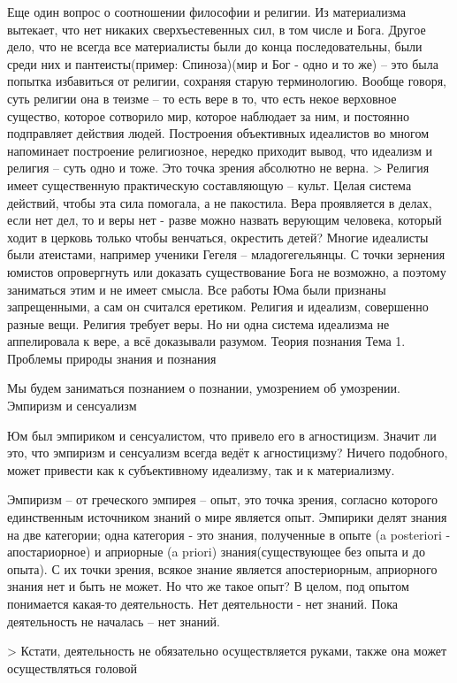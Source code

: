 Еще один вопрос о соотношении философии и религии. Из материализма вытекает, что нет никаких сверхъестевенных сил, в том числе и Бога. Другое дело, что не всегда все материалисты были до конца последовательны, были среди них и пантеисты(пример: Спиноза)(мир и Бог - одно и то же) – это была попытка избавиться от религии, сохраняя старую терминологию. Вообще говоря, суть религии она в теизме – то есть вере в то, что есть некое верховное существо, которое сотворило мир, которое наблюдает за ним, и постоянно подправляет действия людей. Построения объективных идеалистов во многом напоминает построение религиозное, нередко приходит вывод, что идеализм и религия – суть одно и тоже. Это точка зрения абсолютно не верна. > Религия имеет существенную практическую составляющую – культ. Целая система действий, чтобы эта сила помогала, а не пакостила. Вера проявляется в делах, если нет дел, то и веры нет - разве можно назвать верующим человека, который ходит в церковь только чтобы венчаться, окрестить детей? Многие идеалисты были атеистами, например ученики Гегеля – младогегельянцы. С точки зернения юмистов опровергнуть или доказать существование Бога не возможно, а поэтому заниматься этим и не имеет смысла. Все работы Юма были признаны запрещенными, а сам он считался еретиком. Религия и идеализм, совершенно разные вещи. Религия требует веры. Но ни одна система идеализма не аппелировала к вере, а всё доказывали разумом.
Теория познания
Тема 1. Проблемы природы знания и познания

Мы будем заниматься познанием о познании, умозрением об умозрении.
Эмпиризм и сенсуализм

Юм был эмпириком и сенсуалистом, что привело его в агностицизм. Значит ли это, что эмпиризм и сенсуализм всегда ведёт к агностицизму? Ничего подобного, может привести как к субъективному идеализму, так и к материализму.

Эмпиризм – от греческого эмпирея – опыт, это точка зрения, согласно которого единственным источником знаний о мире является опыт. Эмпирики делят знания на две категории; одна категория - это знания, полученные в опыте (a posteriori - апостариорное) и априорные (a priori) знания(существующее без опыта и до опыта). С их точки зрения, всякое знание является апостериорным, априорного знания нет и быть не может. Но что же такое опыт? В целом, под опытом понимается какая-то деятельность. Нет деятельности - нет знаний. Пока деятельность не началась – нет знаний.

> Кстати, деятельность не обязательно осуществляется руками, также она может осуществляться головой


